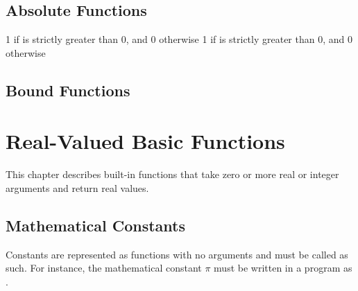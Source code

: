 \begin{description}

\end{description}

\section{Absolute Functions}

\begin{description}
%
%
1 if  is strictly greater than 0, and 0 otherwise
%
1 if  is strictly greater than 0, and 0 otherwise
%
\end{description}
%

\section{Bound Functions}
%
\begin{description}
%
%
\end{description}


\chapter{Real-Valued Basic Functions}

\noindent
This chapter describes built-in functions that take zero or more real
or integer arguments and return real values.  

\section{Mathematical Constants}\label{built-in-constants.section}

Constants are represented as functions with no arguments and must be
called as such.  For instance, the mathematical constant $\pi$ must be
written in a \Stan program as .

%
\begin{description}
%
%
%
%
%
%
\end{description}

